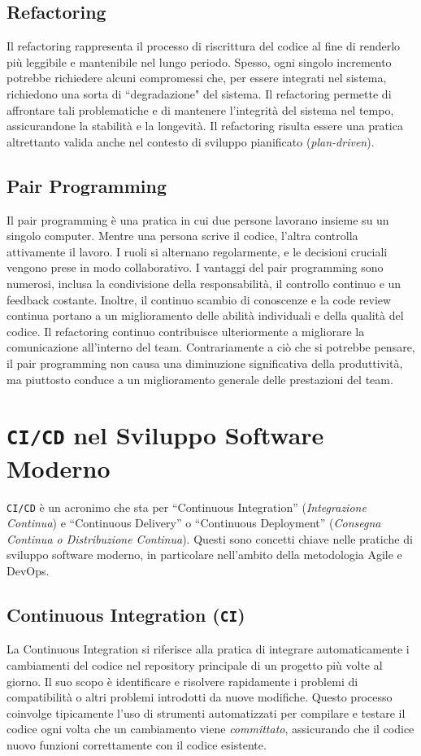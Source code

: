 \subsection{Refactoring}
Il refactoring rappresenta il processo di riscrittura del codice al fine di renderlo più leggibile e mantenibile nel lungo periodo.
Spesso, ogni singolo incremento potrebbe richiedere alcuni compromessi che, per essere integrati nel sistema, richiedono una sorta di
``degradazione" del sistema. Il refactoring permette di affrontare tali problematiche e di mantenere l'integrità del sistema nel tempo,
assicurandone la stabilità e la longevità. Il refactoring risulta essere una pratica altrettanto valida anche nel contesto di sviluppo
pianificato (\textit{plan-driven}).

\subsection{Pair Programming}
Il pair programming è una pratica in cui due persone lavorano insieme su un singolo computer. Mentre una persona scrive il codice,
l'altra controlla attivamente il lavoro. I ruoli si alternano regolarmente, e le decisioni cruciali vengono prese in modo collaborativo.
I vantaggi del pair programming sono numerosi, inclusa la condivisione della responsabilità, il controllo continuo e un feedback costante.
Inoltre, il continuo scambio di conoscenze e la code review continua portano a un miglioramento delle abilità individuali e della qualità
del codice. Il refactoring continuo contribuisce ulteriormente a migliorare la comunicazione all'interno del team. Contrariamente a ciò
che si potrebbe pensare, il pair programming non causa una diminuzione significativa della produttività, ma piuttosto conduce a un miglioramento
generale delle prestazioni del team.
\section{\texttt{CI/CD} nel Sviluppo Software Moderno}

\texttt{CI/CD} è un acronimo che sta per ``Continuous Integration'' (\textit{Integrazione Continua})
e ``Continuous Delivery'' o ``Continuous Deployment'' (\textit{Consegna Continua o Distribuzione Continua}). Questi sono concetti chiave nelle pratiche di
sviluppo software moderno, in particolare nell'ambito della metodologia Agile e DevOps.

\subsection{Continuous Integration (\texttt{CI})}
La Continuous Integration si riferisce alla pratica di integrare automaticamente i cambiamenti del codice nel repository principale di un progetto
più volte al giorno. Il suo scopo è identificare e risolvere rapidamente i problemi di compatibilità o altri problemi introdotti da nuove modifiche.
Questo processo coinvolge tipicamente l'uso di strumenti automatizzati per compilare e testare il codice ogni volta che un cambiamento viene \textit{committato},
assicurando che il codice nuovo funzioni correttamente con il codice esistente.


